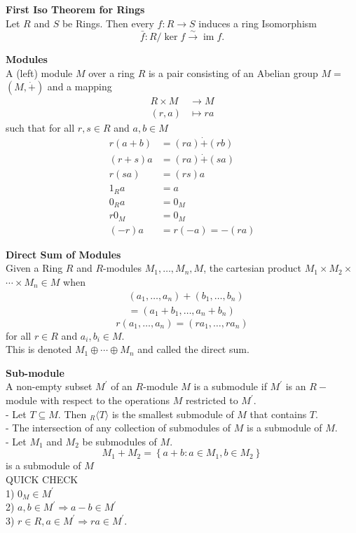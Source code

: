 \documentclass[a4paper, 10pt]{article}
\begin{document}
\begin{multicols*}{3}
\textbf{First Iso Theorem for Rings}\\
Let $R$ and $S$ be Rings. Then every $f: R \longrightarrow S$ induces a ring Isomorphism
$$
\bar{f}: R / \operatorname{ker} f \xrightarrow{\sim} \operatorname{im} f .
$$

\textbf{Modules}\\
A (left) module $M$ over a ring $R$ is a pair consisting of an Abelian group $M=$ $(M, \dot{+})$ and a mapping
\begin{align*}
R \times M & \rightarrow M \\
(r, a) & \mapsto r a
\end{align*}
such that for all $r, s \in R$ and $a, b \in M$ 
\begin{align*}
r(a+b) & =(r a) \dot{+}(r b) \\
(r+s) a & =(r a) \dot{+}(s a) \\
r(s a) & =(r s) a \\
1_R a & =a\\
0_R a&=0_M\\
r 0_M&=0_M\\
(-r) a&=r(-a)=-(r a)
\end{align*}

\textbf{Direct Sum of Modules}\\
Given a Ring $R$ and $R$-modules $M_1, \ldots, M_n, M$, the cartesian product $M_1 \times M_2 \times$ $\cdots \times M_n\in M$ when 
\begin{align*}
&\left(a_1, \ldots, a_n\right)+\left(b_1, \ldots, b_n\right)\\
&=\left(a_1+b_1, \ldots, a_n+b_n\right)
\end{align*}
$$
r\left(a_1, \ldots, a_n\right)=\left(r a_1, \ldots, r a_n\right)
$$
for all $r \in R$ and $a_i, b_i \in M$. \\
This is denoted $M_1 \oplus \cdots \oplus M_n$ and called the direct sum. 

\textbf{Sub-module}\\
A non-empty subset $M^{\prime}$ of an $R$-module $M$ is a submodule if $M^{\prime}$ is an $R-$ module with respect to the operations $M$ restricted to $M^{\prime}$.\\
- Let $T \subseteq M$. Then ${ }_R\langle T\rangle$ is the smallest submodule of $M$ that contains $T$.\\
- The intersection of any collection of submodules of $M$ is a submodule of $M$.\\
- Let $M_1$ and $M_2$ be submodules of $M$. 
$$
M_1+M_2=\left\{a+b: a \in M_1, b \in M_2\right\}
$$
is a submodule of $M$\\
QUICK CHECK\\
1) $0_M \in M^{\prime}$\\
2) $a, b \in M^{\prime} \Rightarrow a-b \in M^{\prime}$\\
3) $r \in R, a \in M^{\prime} \Rightarrow r a \in M^{\prime}$.


\end{multicols*}
\end{document}
